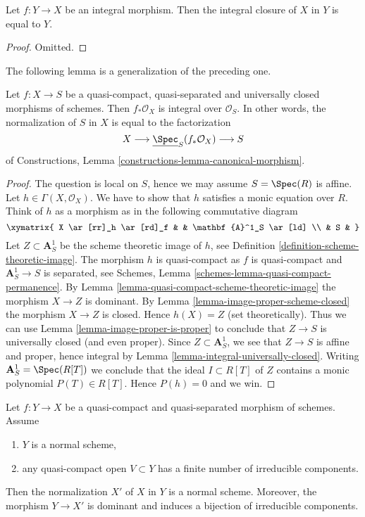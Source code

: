 \begin{lemma}
\label{lemma-normalization-in-integral}
Let $f : Y \to X$ be an integral morphism.
Then the integral closure of $X$ in $Y$ is equal to $Y$.
\end{lemma}

\begin{proof}
Omitted.
\end{proof}

\noindent
The following lemma is a generalization of the preceding one.

\begin{lemma}
\label{lemma-normalization-in-universally-closed}
Let $f : X \to S$ be a quasi-compact, quasi-separated and
universally closed morphisms of schemes.
Then $f_*\mathcal{O}_X$ is integral over $\mathcal{O}_S$. In other
words, the normalization of $S$ in $X$ is equal to the factorization
$$
X \longrightarrow \underline{\Spec}_S(f_*\mathcal{O}_X)
\longrightarrow S
$$
of Constructions, Lemma \ref{constructions-lemma-canonical-morphism}.
\end{lemma}

\begin{proof}
The question is local on $S$, hence we may assume $S = \Spec(R)$
is affine. Let $h \in \Gamma(X, \mathcal{O}_X)$. We have to show that
$h$ satisfies a monic equation over $R$. Think of $h$ as a morphism
as in the following commutative diagram
$$
\xymatrix{
X \ar[rr]_h \ar[rd]_f & & \mathbf{A}^1_S \ar[ld] \\
& S &
}
$$
Let $Z \subset \mathbf{A}^1_S$ be the scheme theoretic image of $h$,
see Definition \ref{definition-scheme-theoretic-image}.
The morphism $h$ is quasi-compact as $f$ is quasi-compact and
$\mathbf{A}^1_S \to S$ is separated, see
Schemes, Lemma \ref{schemes-lemma-quasi-compact-permanence}.
By Lemma \ref{lemma-quasi-compact-scheme-theoretic-image} the
morphism $X \to Z$ is dominant. By
Lemma \ref{lemma-image-proper-scheme-closed} the morphism
$X \to Z$ is closed. Hence $h(X) = Z$ (set theoretically).
Thus we can use
Lemma \ref{lemma-image-proper-is-proper}
to conclude that $Z \to S$ is universally closed (and even proper).
Since $Z \subset \mathbf{A}^1_S$, we see that $Z \to S$ is affine
and proper, hence integral by Lemma \ref{lemma-integral-universally-closed}.
Writing $\mathbf{A}^1_S = \Spec(R[T])$ we conclude that
the ideal $I \subset R[T]$ of $Z$ contains a monic polynomial
$P(T) \in R[T]$. Hence $P(h) = 0$ and we win.
\end{proof}

\begin{lemma}
\label{lemma-normal-normalization}
Let $f : Y \to X$ be a quasi-compact and quasi-separated morphism
of schemes. Assume
\begin{enumerate}
\item $Y$ is a normal scheme,
\item any quasi-compact open $V \subset Y$ has a finite number of
irreducible components.
\end{enumerate}
Then the normalization $X'$ of $X$ in $Y$ is a normal scheme. Moreover,
the morphism $Y \to X'$ is dominant and induces a bijection of
irreducible components.
\end{lemma}

